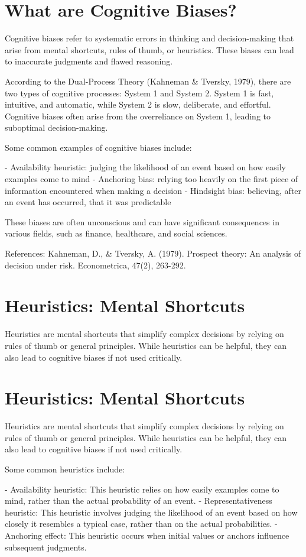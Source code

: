 \documentclass{report}%
\begin{document}
{{{{{{{{{{{%
\section{What are Cognitive Biases?}

Cognitive biases refer to systematic errors in thinking and decision-making that arise from mental shortcuts, rules of thumb, or heuristics. These biases can lead to inaccurate judgments and flawed reasoning.

According to the Dual-Process Theory (Kahneman \& Tversky, 1979), there are two types of cognitive processes: System 1 and System 2. System 1 is fast, intuitive, and automatic, while System 2 is slow, deliberate, and effortful. Cognitive biases often arise from the overreliance on System 1, leading to suboptimal decision-making.

Some common examples of cognitive biases include:

- Availability heuristic: judging the likelihood of an event based on how easily examples come to mind
- Anchoring bias: relying too heavily on the first piece of information encountered when making a decision
- Hindsight bias: believing, after an event has occurred, that it was predictable

These biases are often unconscious and can have significant consequences in various fields, such as finance, healthcare, and social sciences.

References:
Kahneman, D., \& Tversky, A. (1979). Prospect theory: An analysis of decision under risk. Econometrica, 47(2), 263-292.%
\section{Heuristics: Mental Shortcuts}%
Heuristics are mental shortcuts that simplify complex decisions by relying on rules of thumb or general principles. While heuristics can be helpful, they can also lead to cognitive biases if not used critically.

%
\section{Heuristics: Mental Shortcuts}
Heuristics are mental shortcuts that simplify complex decisions by relying on rules of thumb or general principles. While heuristics can be helpful, they can also lead to cognitive biases if not used critically.

Some common heuristics include:

- Availability heuristic: This heuristic relies on how easily examples come to mind, rather than the actual probability of an event.
- Representativeness heuristic: This heuristic involves judging the likelihood of an event based on how closely it resembles a typical case, rather than on the actual probabilities.
- Anchoring effect: This heuristic occurs when initial values or anchors influence subsequent judgments.

}}}}}}}}}}}
\end{document}
